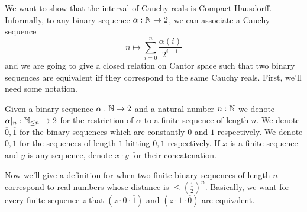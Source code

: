 We want to show that the interval of Cauchy reals is Compact Hausdorff. 
Informally, to any binary sequence $\alpha : \mathbb{N} \to 2$, 
we can associate a Cauchy sequence 
\begin{equation}\label{eqnBinaryEncode}
  n\mapsto \sum\limits_{i = 0 }^n \frac {\alpha(i)}{2^{i+1}}
\end{equation}
and we are going to give a closed relation on Cantor space such that 
two binary sequences are equivalent iff they correspond to the same Cauchy reals. 
%
First, we'll need some notation.
\begin{definition}
Given a binary sequence $\alpha:\mathbb{N} \to 2$ and a natural number $n : \mathbb{N}$  
we denote $\alpha|_n: \mathbb{N}_{\leq n} \to 2$ for the 
restriction of $\alpha$ to a finite sequence of length $n$. 
We denote $\overline 0, \overline 1$ for the binary sequences which are constantly $0$ and $1$ respectively. 
We denote $0,1$ for the sequences of length $1$ hitting $0,1$ respectively. 
If $x$ is a finite sequence and $y$ is any sequence, denote $x\cdot y$ for their concatenation. 
\end{definition} 
Now we'll give a definition for when two finite binary sequences of length $n$ correspond 
to real numbers whose distance is $\leq (\frac12)^n$.
Basically, we want for every finite sequence $z$ that 
$(z \cdot 0 \cdot \overline 1)$ and  $(z \cdot 1 \cdot \overline 0)$ are equivalent. 

